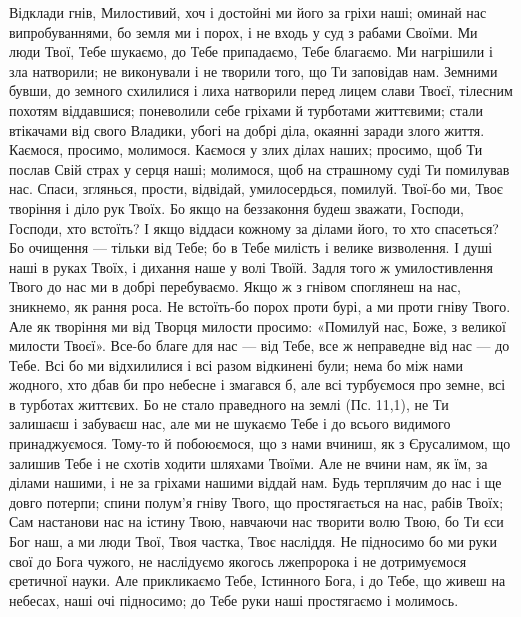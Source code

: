 \documentclass[chapters.tex]{subfiles}
\begin{document}
Відклади гнів, Милостивий, хоч і достойні ми його за гріхи наші; оминай нас випробуваннями, бо земля ми і порох, і не входь у суд з рабами Своїми. Ми люди Твої, Тебе шукаємо, до Тебе припадаємо, Тебе благаємо. Ми нагрішили і зла натворили; не виконували і не творили того, що Ти заповідав нам. Земними бувши, до земного схилилися і лиха натворили перед лицем слави Твоєї, тілесним похотям віддавшися; поневолили себе гріхами й турботами життєвими; стали втікачами від свого Владики, убогі на добрі діла, окаянні заради злого життя. Каємося, просимо, молимося. Каємося у злих ділах наших; просимо, щоб Ти послав Свій страх у серця наші; молимося, щоб на страшному суді Ти помилував нас. Спаси, зглянься, прости, відвідай, умилосердься, помилуй. Твої-бо ми, Твоє творіння і діло рук Твоїх. Бо якщо на беззаконня будеш зважати, Господи, Господи, хто встоїть? І якщо віддаси кожному за ділами його, то хто спасеться? Бо очищення — тільки від Тебе; бо в Тебе милість і велике визволення. І душі наші в руках Твоїх, і дихання наше у волі Твоїй. Задля того ж умилостивлення Твого до нас ми в добрі перебуваємо. Якщо ж з гнівом споглянеш на нас, зникнемо, як рання роса. Не встоїть-бо порох проти бурі, а ми проти гніву Твого. Але як творіння ми від Творця милости просимо: «Помилуй нас, Боже, з великої милости Твоєї». Все-бо благе для нас — від Тебе, все ж неправедне від нас — до Тебе. Всі бо ми відхилилися і всі разом відкинені були; нема бо між нами жодного, хто дбав би про небесне і змагався б, але всі турбуємося про земне, всі в турботах життєвих. Бо не стало праведного на землі (Пс. 11,1), не Ти залишаєш і забуваєш нас, але ми не шукаємо Тебе і до всього видимого принаджуємося. Тому-то й побоюємося, що з нами вчиниш, як з Єрусалимом, що залишив Тебе і не схотів ходити шляхами Твоїми. Але не вчини нам, як їм, за ділами нашими, і не за гріхами нашими віддай нам. Будь терплячим до нас і ще довго потерпи; спини полум’я гніву Твого, що простягається на нас, рабів Твоїх; Сам настанови нас на істину Твою, навчаючи нас творити волю Твою, бо Ти єси Бог наш, а ми люди Твої, Твоя частка, Твоє насліддя. Не підносимо бо ми руки свої до Бога чужого, не наслідуємо якогось лжепророка і не дотримуємося єретичної науки. Але прикликаємо Тебе, Істинного Бога, і до Тебе, що живеш на небесах, наші очі підносимо; до Тебе руки наші простягаємо і молимось.
\end{document}
